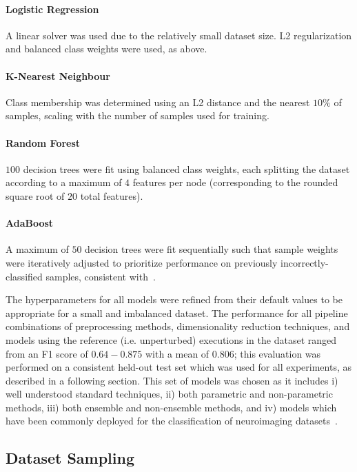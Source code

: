 \documentclass[num-refs]{nbdt-article}
\begin{document}
\paragraph{Logistic Regression} A linear solver was used due to the relatively small dataset size. L2 regularization and balanced class weights were used, as above.

\paragraph{K-Nearest Neighbour} Class membership was determined using an L2 distance and the nearest $10\%$ of samples, scaling with the number of samples used for training.

\paragraph{Random Forest} $100$ decision trees were fit using balanced class weights, each splitting the dataset according to a maximum of $4$ features per node (corresponding to the rounded square root of $20$ total features).

\paragraph{AdaBoost} A maximum of $50$ decision trees were fit sequentially such that sample weights were iteratively adjusted to prioritize performance on previously incorrectly-classified samples, consistent with~\cite{Freund1997-qy}.

The hyperparameters for all models were refined from their default values to be appropriate for a small and imbalanced dataset. The performance for all pipeline combinations of preprocessing methods, dimensionality reduction techniques, and models using the reference (i.e. unperturbed) executions in the dataset ranged from an F1 score of $0.64 - 0.875$ with a mean of $0.806$; this evaluation was performed on a consistent held-out test set which was used for all experiments, as described in a following section. This set of models was chosen as it includes i) well understood standard techniques, ii) both parametric and non-parametric methods, iii) both ensemble and non-ensemble methods, and iv) models which have been commonly deployed for the classification of neuroimaging datasets~\cite{Meier2012-ve,Tunc2016-cz,Zhu2018-cs,Payabvash2019-tm,Crossley2014-tg,Park2015-uj,Nayak2016-wl,Tolan2018-nq}.

\subsection{Dataset Sampling}
\end{document}
